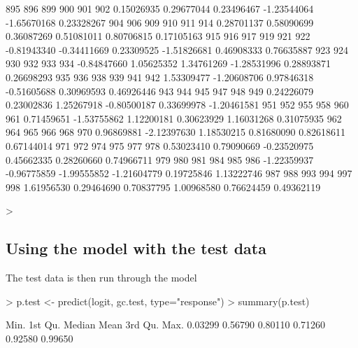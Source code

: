 \documentclass{article}
\begin{document}
\begin{Schunk}
\begin{Soutput}
        895         896         899         900         901         902 
 0.15026935  0.29677044  0.23496467 -1.23544064 -1.65670168  0.23328267 
        904         906         909         910         911         914 
 0.28701137  0.58090699  0.36087269  0.51081011  0.80706815  0.17105163 
        915         916         917         919         921         922 
-0.81943340 -0.34411669  0.23309525 -1.51826681  0.46908333  0.76635887 
        923         924         930         932         933         934 
-0.84847660  1.05625352  1.34761269 -1.28531996  0.28893871  0.26698293 
        935         936         938         939         941         942 
 1.53309477 -1.20608706  0.97846318 -0.51605688  0.30969593  0.46926446 
        943         944         945         947         948         949 
 0.24226079  0.23002836  1.25267918 -0.80500187  0.33699978 -1.20461581 
        951         952         955         958         960         961 
 0.71459651 -1.53755862  1.12200181  0.30623929  1.16031268  0.31075935 
        962         964         965         966         968         970 
 0.96869881 -2.12397630  1.18530215  0.81680090  0.82618611  0.67144014 
        971         972         974         975         977         978 
 0.53023410  0.79090669 -0.23520975  0.45662335  0.28260660  0.74966711 
        979         980         981         984         985         986 
-1.22359937 -0.96775859 -1.99555852 -1.21604779  0.19725846  1.13222746 
        987         988         993         994         997         998 
 1.61956530  0.29464690  0.70837795  1.00968580  0.76624459  0.49362119 
\end{Soutput}
\begin{Sinput}
> 
\end{Sinput}
\end{Schunk}

\subsection*{Using the model with the test data}
The test data is then run through the model
\begin{Schunk}
\begin{Sinput}
> p.test <- predict(logit, gc.test, type="response")
> summary(p.test)
\end{Sinput}
\begin{Soutput}
   Min. 1st Qu.  Median    Mean 3rd Qu.    Max. 
0.03299 0.56790 0.80110 0.71260 0.92580 0.99650 
\end{Soutput}
\end{Schunk}
\end{document}
